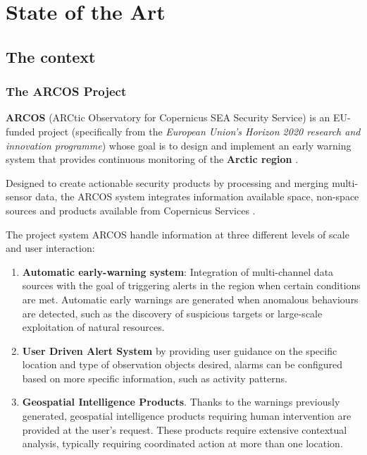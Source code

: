\chapter{State of the Art}

\section{The context}

    \subsection{The ARCOS Project}
    \textbf{ARCOS} (ARCtic Observatory for Copernicus SEA Security Service) is an EU-funded project (specifically from the \textit{European Union’s Horizon 2020 research and innovation programme}) whose goal is to design and implement an early warning system that provides continuous monitoring of the \textbf{Arctic region} \cite{arcos}. 
    
    Designed to create actionable security products by processing and merging multi-sensor data, the ARCOS system integrates information available space, non-space sources and products available from Copernicus Services \cite{copernicus}. 
    
    The project system ARCOS handle information at three different levels of scale and user interaction:
    
    \begin{enumerate}
    \item \textbf{Automatic early-warning system}: Integration of multi-channel data sources with the goal of triggering alerts in the region when certain conditions are met. Automatic early warnings are generated when anomalous behaviours are detected, such as the discovery of suspicious targets or large-scale exploitation of natural resources.
    
    \item \textbf{User Driven Alert System} by providing user guidance on the specific location and type of observation objects desired, alarms can be configured based on more specific information, such as activity patterns.
    
    \item \textbf{Geospatial Intelligence Products}. Thanks to the warnings previously generated, geospatial intelligence products requiring human intervention are provided at the user's request. These products require extensive contextual analysis, typically requiring coordinated action at more than one location.
    \end{enumerate}
    
